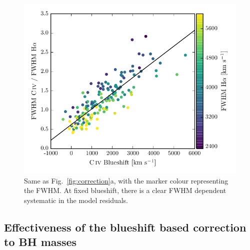 \begin{figure}
    \includegraphics[width=\columnwidth]{figures/chapter03/fwhm_correction_color.pdf}  
    \caption{Same as Fig.~\ref{fig:correction}a, with the marker colour representing the \ha FWHM. At fixed  blueshift, there is a clear \ha FWHM dependent systematic in the model residuals.}   
    \label{fig:residuals_ha_fwhm}
\end{figure}

\subsection{Effectiveness of the  blueshift based correction to BH masses}
\label{sec:effectiveness}

